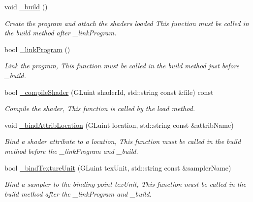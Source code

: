 \begin{DoxyCompactItemize}
\item 
\hypertarget{classgdl_1_1_a_shader_ad0608747a9ef46c049e4bd8960e721d1}{void \hyperlink{classgdl_1_1_a_shader_ad0608747a9ef46c049e4bd8960e721d1}{\-\_\-build} ()}\label{classgdl_1_1_a_shader_ad0608747a9ef46c049e4bd8960e721d1}

\begin{DoxyCompactList}\small\item\em Create the program and attach the shaders loaded This function must be called in the build method after \-\_\-link\-Program. \end{DoxyCompactList}\item 
\hypertarget{classgdl_1_1_a_shader_a791f52f022f2191578b72e3935fb6672}{bool \hyperlink{classgdl_1_1_a_shader_a791f52f022f2191578b72e3935fb6672}{\-\_\-link\-Program} ()}\label{classgdl_1_1_a_shader_a791f52f022f2191578b72e3935fb6672}

\begin{DoxyCompactList}\small\item\em Link the program, This function must be called in the build method just before \-\_\-build. \end{DoxyCompactList}\item 
\hypertarget{classgdl_1_1_a_shader_aeaeb664dec19e428a6e72933e1fc843b}{bool \hyperlink{classgdl_1_1_a_shader_aeaeb664dec19e428a6e72933e1fc843b}{\-\_\-compile\-Shader} (G\-Luint shader\-Id, std\-::string const \&file) const }\label{classgdl_1_1_a_shader_aeaeb664dec19e428a6e72933e1fc843b}

\begin{DoxyCompactList}\small\item\em Compile the shader, This function is called by the load method. \end{DoxyCompactList}\item 
\hypertarget{classgdl_1_1_a_shader_a03c085f34360c4c9e2d5479f88a69916}{void \hyperlink{classgdl_1_1_a_shader_a03c085f34360c4c9e2d5479f88a69916}{\-\_\-bind\-Attrib\-Location} (G\-Luint location, std\-::string const \&attrib\-Name)}\label{classgdl_1_1_a_shader_a03c085f34360c4c9e2d5479f88a69916}

\begin{DoxyCompactList}\small\item\em Bind a shader attribute to a location, This function must be called in the build method before the \-\_\-link\-Program and \-\_\-build. \end{DoxyCompactList}\item 
\hypertarget{classgdl_1_1_a_shader_ad77b6e2c8e74f736bccb2555f35c6fac}{bool \hyperlink{classgdl_1_1_a_shader_ad77b6e2c8e74f736bccb2555f35c6fac}{\-\_\-bind\-Texture\-Unit} (G\-Luint tex\-Unit, std\-::string const \&sampler\-Name)}\label{classgdl_1_1_a_shader_ad77b6e2c8e74f736bccb2555f35c6fac}

\begin{DoxyCompactList}\small\item\em Bind a sampler to the binding point tex\-Unit, This function must be called in the build method after the \-\_\-link\-Program and \-\_\-build. \end{DoxyCompactList}\end{DoxyCompactItemize}


